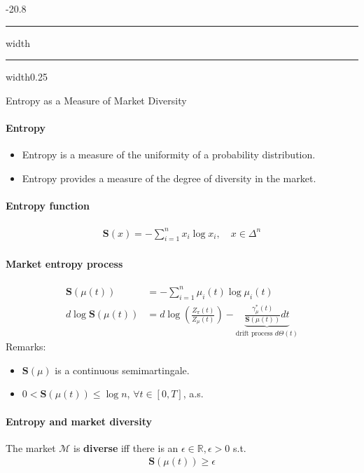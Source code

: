 \documentclass[a4paper,landscape,8pt,fleqn]{scrartcl}
\makeatletter
\renewcommand{\emph}[1]{\textbf{#1}}
\renewcommand{\subsection}{\@startsection{subsection}{1}{0mm}%
{-2\baselineskip}{0.8\baselineskip}%
{\hrule depth 0.2pt width\columnwidth\hrule depth0.75pt
width0.25\columnwidth\vspace*{1.2em}\large\bfseries}}
\makeatother
\begin{document}
\begin{multicols*}{3}
\subsection{Entropy as a Measure of Market Diversity}

\paragraph{Entropy}

\begin{itemize}
\item Entropy is a measure of the uniformity of a probability distribution.
\item Entropy provides a measure of the degree of diversity in the market.
\end{itemize}

\paragraph{Entropy function}

\begin{align*}
\pmb{S} (x) = - \sum_{i=1}^n x_i \log x_i, \quad x \in \Delta^n
\end{align*}

\paragraph{Market entropy process}

\begin{align*}
\pmb{S}(\mu(t)) &= - \sum_{i=1}^n \mu_i(t) \log \mu_i(t) \\
d \log \pmb{S}(\mu(t)) &= d \log \left( \frac{Z_\pi(t)}{Z_\mu(t)} \right) - \underbrace{\frac{\gamma_\mu^\ast(t)}{\pmb{S}(\mu(t))} dt}\limits_{\text{drift process } d\Theta(t)}
\end{align*}
Remarks:
\begin{itemize}
\item $\pmb{S}(\mu)$ is a continuous semimartingale.
\item $0 < \pmb{S}(\mu(t)) \leq \log n$, $\forall t \in [0,T]$, a.s.
\end{itemize}

\paragraph{Entropy and market diversity}

The market $\mathcal{M}$ is \emph{diverse} iff there is an $\epsilon \in \mathbb{R}, \epsilon > 0$ s.t.
\begin{align*}
\pmb{S}(\mu(t)) \geq \epsilon
\end{align*}


\end{multicols*}
\end{document}
